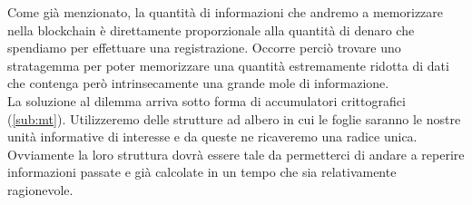 Come già menzionato, la quantità di informazioni che andremo a memorizzare
nella blockchain è direttamente proporzionale alla quantità di denaro che
spendiamo per effettuare una registrazione.
Occorre perciò trovare uno stratagemma per poter memorizzare una quantità
estremamente ridotta di dati che contenga però intrinsecamente una grande
mole di informazione. \\
La soluzione al dilemma arriva sotto forma di accumulatori crittografici (\autoref{sub:mt}).
Utilizzeremo delle strutture ad albero in cui le foglie saranno le nostre unità
informative di interesse e da queste ne ricaveremo una radice unica.
Ovviamente la loro struttura dovrà essere tale da permetterci di andare a reperire
informazioni passate e già calcolate in un tempo che sia relativamente ragionevole.

\newpage